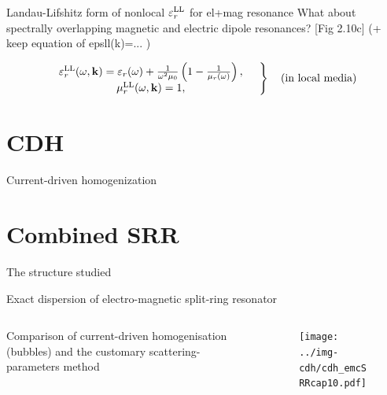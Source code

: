 \documentclass[t]{beamer} \usepackage[english]{babel} \usepackage[utf8]{inputenc} \usetheme{Frankfurt} %
\begin{document}
\begin{frame}{}%

\end{frame} %

\begin{frame}{Landau-Lifshitz form of nonlocal $\varepsilon_r^\text{LL}$ for el+mag resonance}%
What about spectrally overlapping magnetic and electric dipole  resonances? [Fig 2.10c]  (+ keep equation of  epsll(k)=... )
\vfill
	\begin{exampleblock}
		\;\vspace{-1em}
	\begin{equation*}
 \left.  \begin{array}{c}
\varepsilon_r^\text{LL}(\omega,{\mathbf{k}}) = \varepsilon_r(\omega)+\frac{1}{\omega^2 \mu_0}\left(1 - \frac{1}{\mu_r(\omega)}\right), \\
\mu_r^\text{LL}(\omega,{\mathbf{k}}) = 1, 
\end{array} \quad \right\} \quad \text{(in local media)} 
	\end{equation*}
	\end{exampleblock}
\end{frame} %

\begin{frame}{}%
\end{frame} %

\section{CDH}
\begin{frame}{Current-driven homogenization}%

\end{frame} 		%


\section{Combined SRR}
\begin{frame}{The structure studied}%
\end{frame} %

\begin{frame}{Exact dispersion of electro-magnetic split-ring resonator}	%
\begin{columns}[T] %
	\begin{column}{.5\textwidth}
	\vspace{3mm}
	\noindent  Comparison of current-driven homogenisation (bubbles) and the customary scattering-parameters method
	\end{column}%
	\begin{column}{.5\textwidth}
	\begin{figure}[h] \label{fg_} \centering 
	\texttt{[image: ../img-cdh/cdh\_emcSRRcap10.pdf]}
	\end{figure}
	\end{column}%
\end{columns}
\end{frame} 		%
\end{document}

